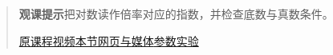 \begin{quote}\small\textbf{观课提示}\quad 把对数读作倍率对应的指数，并检查底数与真数条件。

\href{https://www.youtube.com/watch?v=cEvgcoyZvB4}{原课程视频}\quad\href{https://vitael04213.github.io/3blue1brown-notes/lessons/ldm-logarithms.html}{本节网页与媒体}\quad\href{https://vitael04213.github.io/3blue1brown-notes/lab.html\#derivative}{参数实验}
\end{quote}
